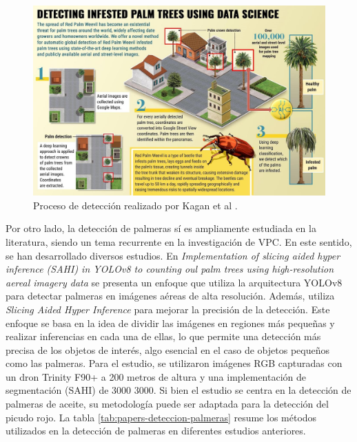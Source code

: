 \begin{figure}[htpb]
  \centering
  \includegraphics[scale=1.8]{./Figures/kagan_automatic_2021-process.jpg}
  \caption{Proceso de detección realizado por Kagan et al \protect\footnotemark.}
  \label{fig:kagan-automatic-2021-process}
\end{figure}


Por otro lado, la detección de palmeras sí es ampliamente estudiada en la literatura, siendo un tema recurrente en la investigación de VPC. En este sentido, se han desarrollado diversos estudios. En \textit{Implementation of slicing aided hyper inference (SAHI) in YOLOv8 to counting oul palm trees using high-resolution aereal imagery data} \citep{zhorif_implementation_2024} se presenta un enfoque que utiliza la arquitectura YOLOv8 para detectar palmeras en imágenes aéreas de alta resolución. Además, utiliza \textit{Slicing Aided Hyper Inference} para mejorar la precisión de la detección. Este enfoque se basa en la idea de dividir las imágenes en regiones más pequeñas y realizar inferencias en cada una de ellas, lo que permite una detección más precisa de los objetos de interés, algo esencial en el caso de objetos pequeños como las palmeras. Para el estudio, se utilizaron imágenes RGB capturadas con un dron Trinity F90+ a 200 metros de altura y una implementación de segmentación (SAHI) de \SI{3000}{}\,\texttimes\,\SI{3000}{\pixel}. Si bien el estudio se centra en la detección de palmeras de aceite, su metodología puede ser adaptada para la detección del picudo rojo. La tabla \ref{tab:papers-deteccion-palmeras} resume los métodos utilizados en la detección de palmeras en diferentes estudios anteriores.

